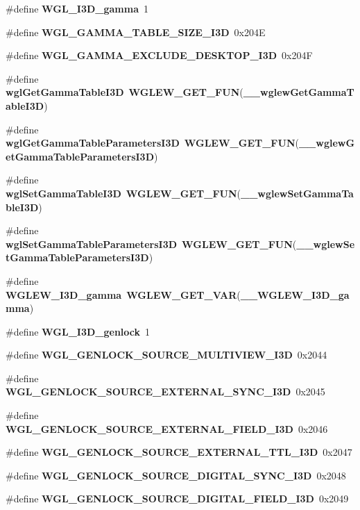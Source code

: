 \begin{DoxyCompactItemize}
\item 
\#define {\bf W\+G\+L\+\_\+\+I3\+D\+\_\+gamma}~1
\item 
\#define {\bf W\+G\+L\+\_\+\+G\+A\+M\+M\+A\+\_\+\+T\+A\+B\+L\+E\+\_\+\+S\+I\+Z\+E\+\_\+\+I3D}~0x204E
\item 
\#define {\bf W\+G\+L\+\_\+\+G\+A\+M\+M\+A\+\_\+\+E\+X\+C\+L\+U\+D\+E\+\_\+\+D\+E\+S\+K\+T\+O\+P\+\_\+\+I3D}~0x204F
\item 
\#define {\bf wgl\+Get\+Gamma\+Table\+I3D}~{\bf W\+G\+L\+E\+W\+\_\+\+G\+E\+T\+\_\+\+F\+UN}({\bf \+\_\+\+\_\+wglew\+Get\+Gamma\+Table\+I3D})
\item 
\#define {\bf wgl\+Get\+Gamma\+Table\+Parameters\+I3D}~{\bf W\+G\+L\+E\+W\+\_\+\+G\+E\+T\+\_\+\+F\+UN}({\bf \+\_\+\+\_\+wglew\+Get\+Gamma\+Table\+Parameters\+I3D})
\item 
\#define {\bf wgl\+Set\+Gamma\+Table\+I3D}~{\bf W\+G\+L\+E\+W\+\_\+\+G\+E\+T\+\_\+\+F\+UN}({\bf \+\_\+\+\_\+wglew\+Set\+Gamma\+Table\+I3D})
\item 
\#define {\bf wgl\+Set\+Gamma\+Table\+Parameters\+I3D}~{\bf W\+G\+L\+E\+W\+\_\+\+G\+E\+T\+\_\+\+F\+UN}({\bf \+\_\+\+\_\+wglew\+Set\+Gamma\+Table\+Parameters\+I3D})
\item 
\#define {\bf W\+G\+L\+E\+W\+\_\+\+I3\+D\+\_\+gamma}~{\bf W\+G\+L\+E\+W\+\_\+\+G\+E\+T\+\_\+\+V\+AR}({\bf \+\_\+\+\_\+\+W\+G\+L\+E\+W\+\_\+\+I3\+D\+\_\+gamma})
\item 
\#define {\bf W\+G\+L\+\_\+\+I3\+D\+\_\+genlock}~1
\item 
\#define {\bf W\+G\+L\+\_\+\+G\+E\+N\+L\+O\+C\+K\+\_\+\+S\+O\+U\+R\+C\+E\+\_\+\+M\+U\+L\+T\+I\+V\+I\+E\+W\+\_\+\+I3D}~0x2044
\item 
\#define {\bf W\+G\+L\+\_\+\+G\+E\+N\+L\+O\+C\+K\+\_\+\+S\+O\+U\+R\+C\+E\+\_\+\+E\+X\+T\+E\+R\+N\+A\+L\+\_\+\+S\+Y\+N\+C\+\_\+\+I3D}~0x2045
\item 
\#define {\bf W\+G\+L\+\_\+\+G\+E\+N\+L\+O\+C\+K\+\_\+\+S\+O\+U\+R\+C\+E\+\_\+\+E\+X\+T\+E\+R\+N\+A\+L\+\_\+\+F\+I\+E\+L\+D\+\_\+\+I3D}~0x2046
\item 
\#define {\bf W\+G\+L\+\_\+\+G\+E\+N\+L\+O\+C\+K\+\_\+\+S\+O\+U\+R\+C\+E\+\_\+\+E\+X\+T\+E\+R\+N\+A\+L\+\_\+\+T\+T\+L\+\_\+\+I3D}~0x2047
\item 
\#define {\bf W\+G\+L\+\_\+\+G\+E\+N\+L\+O\+C\+K\+\_\+\+S\+O\+U\+R\+C\+E\+\_\+\+D\+I\+G\+I\+T\+A\+L\+\_\+\+S\+Y\+N\+C\+\_\+\+I3D}~0x2048
\item 
\#define {\bf W\+G\+L\+\_\+\+G\+E\+N\+L\+O\+C\+K\+\_\+\+S\+O\+U\+R\+C\+E\+\_\+\+D\+I\+G\+I\+T\+A\+L\+\_\+\+F\+I\+E\+L\+D\+\_\+\+I3D}~0x2049

\end{DoxyCompactItemize}
